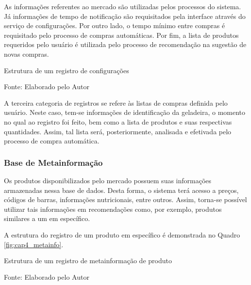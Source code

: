As informações referentes ao mercado são utilizadas pelos processos do sistema. Já informações de tempo de notificação são requisitados pela interface através do serviço de configurações. Por outro lado, o tempo mínimo entre compras é requisitado pelo processo de compras automáticas. Por fim, a lista de produtos requeridos pelo usuário é utilizada pelo processo de recomendação na sugestão de novas compras.

\begin{quadro}[htb]
    \caption{Estrutura de um registro de configurações}
    \label{fig:cap4_settings}
     
    \footnotesize{Fonte: Elaborado pelo Autor}
\end{quadro}

A terceira categoria de registros se refere às listas de compras definida pelo usuário. Neste caso, tem-se informações de identificação da geladeira, o momento no qual ao registro foi feito, bem como a lista de produtos e suas respectivas quantidades. Assim, tal lista será, posteriormente, analisada e efetivada pelo processo de compra automática.



\ProximoForaDoSumario 
\subsubsection{Base de Metainformação} \label{sssec:metainfo}


Os produtos disponibilizados pelo mercado possuem suas informações armazenadas nessa base de dados. Desta forma, o sistema terá acesso a preços, códigos de barras, informações nutricionais, entre outros. Assim, torna-se possível utilizar tais informações em recomendações como, por exemplo, produtos similares a um em específico. 

A estrutura do registro de um produto em específico é demonstrada no Quadro \ref{fig:cap4_metainfo}.

\begin{quadro}[htb]
    \caption{Estrutura de um registro de metainformação de produto}
    \label{fig:cap4_metainfo}
    
    \footnotesize{Fonte: Elaborado pelo Autor}
\end{quadro}


